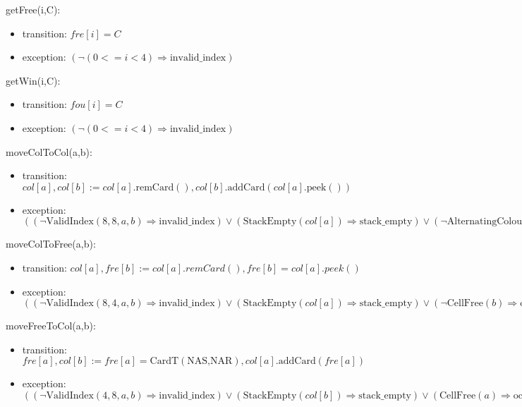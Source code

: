 \documentclass[12pt]{article}
\newcommand{\means}{\Rightarrow}
\newcommand{\m}[1]{\mbox{#1}}
\begin{document}
\noindent getFree(i,C):
\begin{itemize}
  \item transition: $fre[i]=C$
  \item exception: $(\lnot (0<=i<4) \means \m{invalid\_index})$
\end{itemize}

\noindent getWin(i,C):
\begin{itemize}
  \item transition: $fou[i]=C$
  \item exception: $(\lnot (0<=i<4) \means \m{invalid\_index})$
\end{itemize}

\noindent moveColToCol(a,b):
\begin{itemize}
    \item transition: $col[a], col[b] := col[a].\m{remCard}(), col[b].\m{addCard}(col[a].\m{peek}())$
    \item exception: $((\lnot \m{ValidIndex}(8,8,a,b) \means \m{invalid\_index}) \lor (\m{StackEmpty}(col[a]) \means \m{stack\_empty}) \lor (\lnot \m{AlternatingColour}(col[a].\m{peek}(),col[b].\m{peek}()) \means \m{not\_alternating\_colour}) \lor (\lnot \m{DecreasingRank}(col[a].\m{peek}(),col[b].\m{peek}()) \means \m{not\_decreasing\_rank}))$
\end{itemize}

\noindent moveColToFree(a,b):
\begin{itemize}
    \item transition: $col[a], fre[b] := col[a].remCard(), fre[b]=col[a].peek()$
    \item exception: $((\lnot \m{ValidIndex}(8,4,a,b) \means \m{invalid\_index}) \lor (\m{StackEmpty}(col[a]) \means \m{stack\_empty}) \lor (\lnot \m{CellFree}(b) \means \m{occupied\_cell}))$
\end{itemize}

\noindent moveFreeToCol(a,b):
\begin{itemize}
    \item transition: $fre[a], col[b] := fre[a]=\mbox{CardT}(\mbox{NAS,NAR}), col[a].\m{addCard}(fre[a])$
    \item exception: $((\lnot \m{ValidIndex}(4,8,a,b) \means \m{invalid\_index}) \lor (\m{StackEmpty}(col[b]) \means \m{stack\_empty}) \lor (\m{CellFree}(a) \means \m{occupied\_cell})) \lor (\lnot \m{AlternatingColour}(fre[a],col[b].\m{peek}()) \means \m{not\_alternating\_colour}) \lor (\lnot \m{DecreasingRank}(fre[a],col[b].\m{peek}()) \means \m{not\_decreasing\_rank}))$
\end{itemize}
\end{document}
